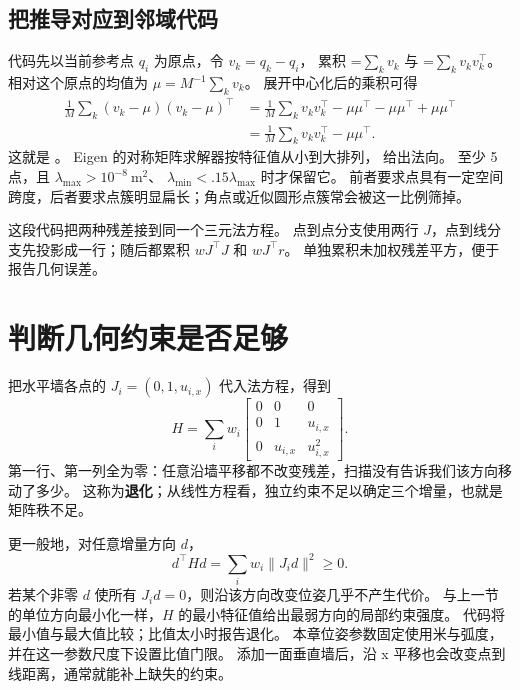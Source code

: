 \subsection{把推导对应到邻域代码}
代码先以当前参考点 $q_i$ 为原点，令 $v_k=q_k-q_i$，
累积 =$\sum_kv_k$ 与 =$\sum_kv_kv_k^\top$。
相对这个原点的均值为 $\mu=M^{-1}\sum_kv_k$。
展开中心化后的乘积可得
\begin{align}
\frac1M\sum_k(v_k-\mu)(v_k-\mu)^\top
&=\frac1M\sum_kv_kv_k^\top
 -\mu\mu^\top-\mu\mu^\top+\mu\mu^\top\\
&=\frac1M\sum_kv_kv_k^\top-\mu\mu^\top.
\end{align}
这就是 。
Eigen 的对称矩阵求解器按特征值从小到大排列， 给出法向。
至少 5 点，且 $\lambda_{\max}>10^{-8}\ \mathrm{m^2}$、
$\lambda_{\min}<.15\lambda_{\max}$ 时才保留它。
前者要求点具有一定空间跨度，后者要求点簇明显扁长；角点或近似圆形点簇常会被这一比例筛掉。

\par\noindent\begin{minipage}{\linewidth}

\end{minipage}\par

这段代码把两种残差接到同一个三元法方程。
点到点分支使用两行 $J$，点到线分支先投影成一行；随后都累积 $wJ^\top J$ 和 $wJ^\top r$。
 单独累积未加权残差平方，便于报告几何误差。

\section{判断几何约束是否足够}
把水平墙各点的 $J_i=(0,1,u_{i,x})$ 代入法方程，得到
\begin{equation}
H=\sum_iw_i\begin{bmatrix}
0&0&0\\0&1&u_{i,x}\\0&u_{i,x}&u_{i,x}^2
\end{bmatrix}.
\end{equation}
第一行、第一列全为零：任意沿墙平移都不改变残差，扫描没有告诉我们该方向移动了多少。
这称为\textbf{退化}；从线性方程看，独立约束不足以确定三个增量，也就是矩阵秩不足。

更一般地，对任意增量方向 $d$，
\begin{equation}
d^\top Hd=\sum_iw_i\|J_i d\|^2\ge0.
\end{equation}
若某个非零 $d$ 使所有 $J_i d=0$，则沿该方向改变位姿几乎不产生代价。
与上一节的单位方向最小化一样，$H$ 的最小特征值给出最弱方向的局部约束强度。
代码将最小值与最大值比较；比值太小时报告退化。
本章位姿参数固定使用米与弧度，并在这一参数尺度下设置比值门限。
添加一面垂直墙后，沿 x 平移也会改变点到线距离，通常就能补上缺失的约束。

